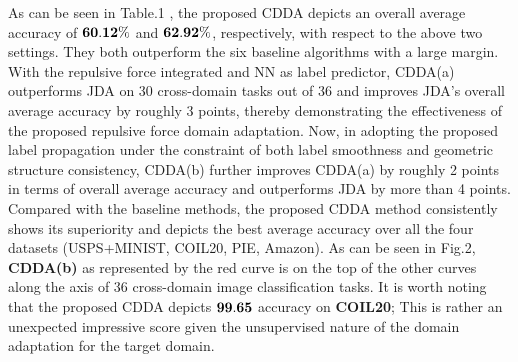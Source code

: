 \documentclass[10pt,twocolumn,letterpaper]{article}
\begin{document}
\begin{CJK*}{UTF8}{gkai}
    As can be seen  in Table.1 , the proposed CDDA depicts an overall average accuracy of  $\bf 60.12\%$ and $\bf 62.92\%$, respectively,  with respect to the above two settings. They both outperform the six baseline algorithms with a large margin. With the repulsive force integrated and NN as label predictor, CDDA(a) outperforms JDA on 30 cross-domain tasks out of 36 and improves JDA's overall average accuracy by roughly 3 points, thereby demonstrating the effectiveness of the proposed repulsive force domain adaptation. Now, in adopting the proposed label propagation under the constraint of both label smoothness and geometric structure consistency, CDDA(b) further improves CDDA(a) by roughly 2 points in terms of overall average accuracy and outperforms JDA by more than 4 points. 
    Compared with the baseline methods, the proposed CDDA method consistently shows its superiority  and depicts the best average  accuracy over all the four datasets (USPS+MINIST, COIL20, PIE, Amazon).  As can be seen in Fig.2,  \textbf{CDDA(b)} as represented by the red curve is on the top of the other curves along  the axis of 36 cross-domain image classification tasks.  It is worth noting  that the proposed  CDDA depicts $\bf 99.65$ accuracy on \textbf{COIL20}; This is rather an unexpected impressive score given the unsupervised nature of the domain adaptation for the target domain.
			
		
		

\end{CJK*}
\end{document}
